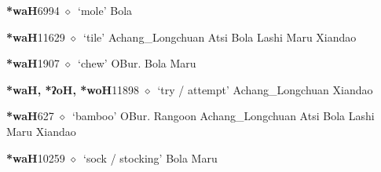   \begin{list}{}{\leftmargin=1.5em \itemindent=-1.5em}
  \item {\footnotesize \textbf{*waH}}{\tiny 6994}
         $\diamond$~`mole'
         Bola 
  \item {\footnotesize \textbf{*waH}}{\tiny 11629}
\hspace{1ex}
         $\diamond$~`tile'
         Achang\_Longchuan 
\hspace{1ex}
         Atsi 
\hspace{1ex}
         Bola 
\hspace{1ex}
         Lashi 
\hspace{1ex}
         Maru 
\hspace{1ex}
         Xiandao 
  \item {\footnotesize \textbf{*waH}}{\tiny 1907}
\hspace{1ex}
         $\diamond$~`chew'
         OBur. 
\hspace{1ex}
         Bola 
\hspace{1ex}
         Maru 
  \item {\footnotesize \textbf{*waH, *ʔoH, *woH}}{\tiny 11898}
\hspace{1ex}
         $\diamond$~`try / attempt'
         Achang\_Longchuan 
\hspace{1ex}
         Xiandao 
  \item {\footnotesize \textbf{*waH}}{\tiny 627}
\hspace{1ex}
         $\diamond$~`bamboo'
         OBur. 
\hspace{1ex}
         Rangoon 
\hspace{1ex}
         Achang\_Longchuan 
\hspace{1ex}
         Atsi 
\hspace{1ex}
         Bola 
\hspace{1ex}
         Lashi 
\hspace{1ex}
         Maru 
\hspace{1ex}
         Xiandao 
  \item {\footnotesize \textbf{*waH}}{\tiny 10259}
\hspace{1ex}
         $\diamond$~`sock / stocking'
         Bola 
\hspace{1ex}
         Maru 
  \end{list}
